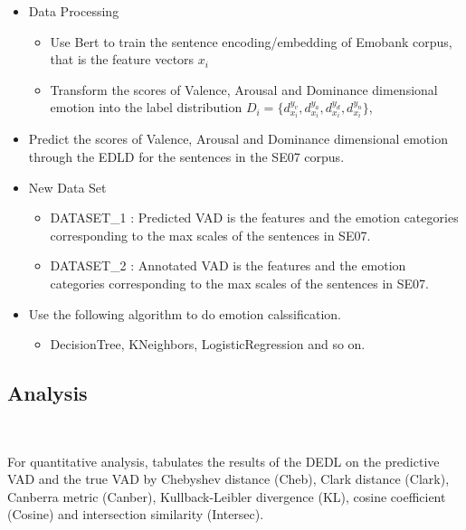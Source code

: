 \begin{itemize}
	\item
	Data Processing
	
	\begin{itemize}
		\item 
		Use Bert to train the sentence encoding/embedding
		of Emobank corpus, that is the feature vectors $ x_{i} $
		\item 
		Transform the scores of Valence, Arousal and Dominance 
		dimensional emotion into 
		the label distribution 
		$ D_{i} = \{d^{y_{v}}_{x_{i}},  d^{y_{a}}_{x_{i}}, d^{y_{d}}_{x_{i}}, d^{y_{n}}_{x_{i}}\} $,
	\end{itemize}
	
	\item 
	Predict the scores of 
	Valence, Arousal and Dominance dimensional emotion
	through the EDLD
	for the sentences in the SE07 corpus.
	
	\item 
	New Data Set
	
	\begin{itemize}
		\item 
		DATASET\_1 : Predicted VAD is the features and 
		the emotion categories corresponding to 
		the max scales of the sentences in SE07.
		\item 
		DATASET\_2 : Annotated VAD is the features and 
		the emotion categories corresponding to 
		the max scales of the sentences in SE07.
	\end{itemize}
	
	\item 
	Use the following algorithm
	to do emotion calssification.	
	\begin{itemize}
		\item DecisionTree, KNeighbors, LogisticRegression and so on.
		
	\end{itemize}
\end{itemize}

\subsection{Analysis}
\

For quantitative analysis,
  tabulates the results of the DEDL
on the predictive VAD and the true VAD
by Chebyshev distance (Cheb), 
Clark distance (Clark), Canberra metric (Canber),
 Kullback-Leibler divergence (KL), cosine coefficient (Cosine) 
 and intersection similarity (Intersec).
 

